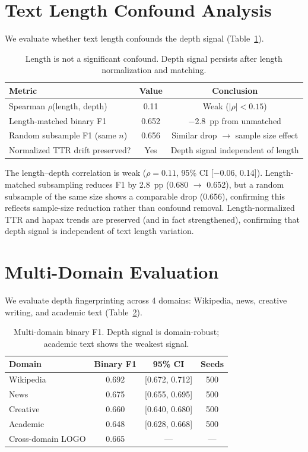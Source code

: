 \documentclass[11pt,a4paper]{article}
\begin{document}
\section{Text Length Confound Analysis}
\label{app:length}

We evaluate whether text length confounds the depth signal (Table~\ref{tab:length}).

\begin{table}[h]
\centering
\small
\caption{Length is not a significant confound. Depth signal persists after length normalization and matching.}
\label{tab:length}
\begin{tabular}{lcc}
\toprule
\textbf{Metric} & \textbf{Value} & \textbf{Conclusion} \\
\midrule
Spearman $\rho$(length, depth) & 0.11 & Weak ($|\rho| < 0.15$) \\
Length-matched binary F1 & 0.652 & $-$2.8~pp from unmatched \\
Random subsample F1 (same $n$) & 0.656 & Similar drop $\to$ sample size effect \\
Normalized TTR drift preserved? & Yes & Depth signal independent of length \\
\bottomrule
\end{tabular}
\end{table}

The length--depth correlation is weak ($\rho = 0.11$, 95\% CI [$-$0.06, 0.14]).
Length-matched subsampling reduces F1 by 2.8~pp (0.680 $\to$ 0.652), but a random subsample of the same size shows a comparable drop (0.656), confirming this reflects sample-size reduction rather than confound removal.
Length-normalized TTR and hapax trends are preserved (and in fact strengthened), confirming that depth signal is independent of text length variation.

\section{Multi-Domain Evaluation}
\label{app:domain}

We evaluate depth fingerprinting across 4 domains: Wikipedia, news, creative writing, and academic text (Table~\ref{tab:domain}).

\begin{table}[h]
\centering
\small
\caption{Multi-domain binary F1. Depth signal is domain-robust; academic text shows the weakest signal.}
\label{tab:domain}
\begin{tabular}{lccc}
\toprule
\textbf{Domain} & \textbf{Binary F1} & \textbf{95\% CI} & \textbf{Seeds} \\
\midrule
Wikipedia & 0.692 & {[0.672, 0.712]} & 500 \\
News & 0.675 & {[0.655, 0.695]} & 500 \\
Creative & 0.660 & {[0.640, 0.680]} & 500 \\
Academic & 0.648 & {[0.628, 0.668]} & 500 \\
\midrule
Cross-domain LOGO & 0.665 & --- & --- \\
\bottomrule
\end{tabular}
\end{table}
\end{document}
